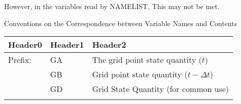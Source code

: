 However, in the variables read by NAMELIST, This may not be met.

Conventions on the Correspondence between Variable Names and Contents

\begin{longtable}[]{@{}lll@{}}
\toprule
\begin{minipage}[b]{0.30\columnwidth}\raggedright
Header0\strut
\end{minipage} & \begin{minipage}[b]{0.30\columnwidth}\raggedright
Header1\strut
\end{minipage} & \begin{minipage}[b]{0.30\columnwidth}\raggedright
Header2\strut
\end{minipage}\tabularnewline
\midrule
\endhead
\begin{minipage}[t]{0.30\columnwidth}\raggedright
Prefix:\strut
\end{minipage} & \begin{minipage}[t]{0.30\columnwidth}\raggedright
GA\strut
\end{minipage} & \begin{minipage}[t]{0.30\columnwidth}\raggedright
The grid point state quantity (\(t\))\strut
\end{minipage}\tabularnewline
\begin{minipage}[t]{0.30\columnwidth}\raggedright
\strut
\end{minipage} & \begin{minipage}[t]{0.30\columnwidth}\raggedright
GB\strut
\end{minipage} & \begin{minipage}[t]{0.30\columnwidth}\raggedright
Grid point state quantity (\(t-\Delta t\))\strut
\end{minipage}\tabularnewline
\begin{minipage}[t]{0.30\columnwidth}\raggedright
\strut
\end{minipage} & \begin{minipage}[t]{0.30\columnwidth}\raggedright
GD\strut
\end{minipage} & \begin{minipage}[t]{0.30\columnwidth}\raggedright
Grid State Quantity (for common use)\strut
\end{minipage}\tabularnewline
\begin{minipage}[t]{0.30\columnwidth}\raggedright
\strut
\end{minipage} & \begin{minipage}[t]{0.30\columnwidth}\raggedright

\end{minipage}
\end{longtable}
